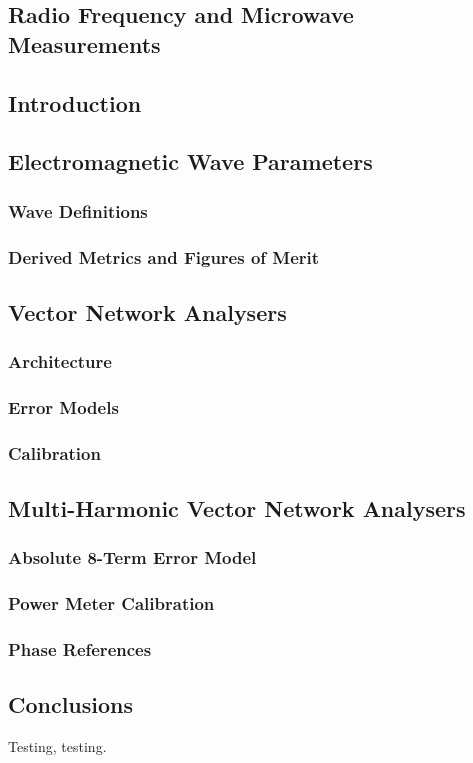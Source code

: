 \documentclass[../thesis/thesis.tex]{subfiles}
\begin{document}
\begin{refsection}
\chapter{Radio Frequency and Microwave Measurements}
\section{Introduction}
\section{Electromagnetic Wave Parameters}
\subsection{Wave Definitions}
\subsection{Derived Metrics and Figures of Merit}
\section{Vector Network Analysers}
\subsection{Architecture}
\subsection{Error Models}
\subsection{Calibration}
\section{Multi-Harmonic Vector Network Analysers}
\subsection{Absolute 8-Term Error Model}
\subsection{Power Meter Calibration}
\subsection{Phase References}
\section{Conclusions}
Testing, testing\cite{Stant_2016_Coll, Stant_2016}.
\printbibliography
\end{refsection}
\end{document}
